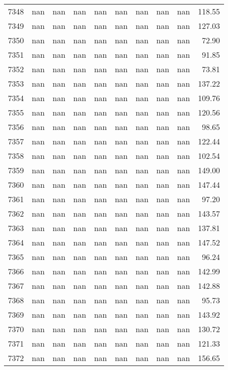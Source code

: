 \begin{tabular}{lrrrrrrrrr}
7348 & nan & nan & nan & nan & nan & nan & nan & nan & 118.55 \\
7349 & nan & nan & nan & nan & nan & nan & nan & nan & 127.03 \\
7350 & nan & nan & nan & nan & nan & nan & nan & nan & 72.90 \\
7351 & nan & nan & nan & nan & nan & nan & nan & nan & 91.85 \\
7352 & nan & nan & nan & nan & nan & nan & nan & nan & 73.81 \\
7353 & nan & nan & nan & nan & nan & nan & nan & nan & 137.22 \\
7354 & nan & nan & nan & nan & nan & nan & nan & nan & 109.76 \\
7355 & nan & nan & nan & nan & nan & nan & nan & nan & 120.56 \\
7356 & nan & nan & nan & nan & nan & nan & nan & nan & 98.65 \\
7357 & nan & nan & nan & nan & nan & nan & nan & nan & 122.44 \\
7358 & nan & nan & nan & nan & nan & nan & nan & nan & 102.54 \\
7359 & nan & nan & nan & nan & nan & nan & nan & nan & 149.00 \\
7360 & nan & nan & nan & nan & nan & nan & nan & nan & 147.44 \\
7361 & nan & nan & nan & nan & nan & nan & nan & nan & 97.20 \\
7362 & nan & nan & nan & nan & nan & nan & nan & nan & 143.57 \\
7363 & nan & nan & nan & nan & nan & nan & nan & nan & 137.81 \\
7364 & nan & nan & nan & nan & nan & nan & nan & nan & 147.52 \\
7365 & nan & nan & nan & nan & nan & nan & nan & nan & 96.24 \\
7366 & nan & nan & nan & nan & nan & nan & nan & nan & 142.99 \\
7367 & nan & nan & nan & nan & nan & nan & nan & nan & 142.88 \\
7368 & nan & nan & nan & nan & nan & nan & nan & nan & 95.73 \\
7369 & nan & nan & nan & nan & nan & nan & nan & nan & 143.92 \\
7370 & nan & nan & nan & nan & nan & nan & nan & nan & 130.72 \\
7371 & nan & nan & nan & nan & nan & nan & nan & nan & 121.33 \\
7372 & nan & nan & nan & nan & nan & nan & nan & nan & 156.65 \\

\end{tabular}
